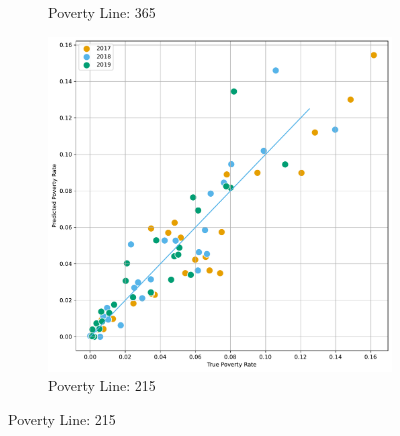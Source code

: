 \begin{figure}[H]
\begin{subfigure}[b]{0.47\textwidth}
                 \caption{Poverty Line: 365}
             \end{subfigure} 
              \hfill
             \begin{subfigure}[b]{0.47\textwidth}
                 \centering
                 \includegraphics[width=\textwidth]{../figures/baseline_report/fig4_2_prediction_vs_true_poverty_rate_regions_p215_scatter.pdf}
                 \caption{Poverty Line: 215}
             \end{subfigure} 
        \end{figure}
    
    




